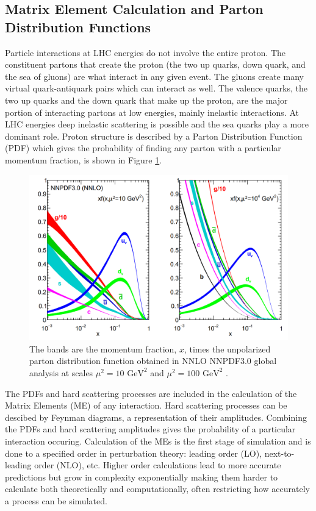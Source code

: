 \subsection{ Matrix Element Calculation and Parton Distribution Functions}

Particle interactions at LHC energies do not involve the entire proton.  The constituent partons that create the proton (the two up quarks, down quark, and the sea of gluons) are what interact in any given event.  The gluons create many virtual quark-antiquark pairs which can interact as well.  The valence quarks, the two up quarks and the down quark that make up the proton, are the major portion of interacting partons at low energies, mainly inelastic interactions.  At LHC energies deep inelastic scattering is possible and the sea quarks play a more dominant role.  Proton structure is described by a Parton Distribution Function (PDF) which gives the probability of finding any parton with a particular momentum fraction, is shown in Figure \ref{fig:PDF}.

\begin{figure}[h!]
	\centering
	\includegraphics[width=\columnwidth]{../ThesisImages/Simulation/PDF.png}
	\caption[The bands are the momentum fraction, $x$, times the unpolarized parton distribution function obtained in NNLO NNPDF3.0 global analysis at scales $\mu^2= 10$ GeV and $\mu^2 = 100 \text{ GeV}^2$.]{The bands are the momentum fraction, $x$, times the unpolarized parton distribution function obtained in NNLO NNPDF3.0 global analysis at scales $\mu^2= 10 \text{ GeV}^2$ and $\mu^2 = 100 \text{ GeV}^2$ \cite{PDG2018} .
	}
	\label{fig:PDF}
\end{figure}
The PDFs and hard scattering processes are included in the calculation of the Matrix Elements (ME) of any interaction.  Hard scattering processes can be descibed by Feynman diagrams, a representation of their amplitudes.  Combining the PDFs and hard scattering amplitudes gives the probability of a particular interaction occuring.  Calculation of the MEs is the first stage of simulation and is done to a specified order in perturbation theory: leading order (LO), next-to-leading order (NLO), etc.  Higher order calculations lead to more accurate predictions but grow in complexity exponentially making them harder to calculate both theoretically and computationally, often restricting how accurately a process can be simulated.  

